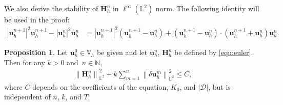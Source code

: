 \documentclass[11pt, reqno]{amsart}
\theoremstyle{definition}
\newtheorem{proposition}[theorem]{Proposition}
\theoremstyle{remark}
\numberwithin{equation}{section}
\newcommand{\bff}{\boldsymbol}
\newcommand{\bb}{\mathbb}
\newcommand{\norm}[2]{\left\|{#1}\right\|_{#2}}
\newcommand{\abs}[1]{\left|{#1}\right|}
\begin{document}
We also derive the stability of $\bff{H}_h^{n}$ in $\ell^\infty(\bb{L}^2)$ norm. The following identity will be used in the proof:
\begin{align}
	\label{equ:identity psi euler}
	\abs{\bff{u}_h^{n+1}}^2 \bff{u}_h^{n+1} - \abs{\bff{u}_h^n}^2 \bff{u}_h^n
	&=
	\abs{\bff{u}_h^{n+1}}^2 \left(\bff{u}_h^{n+1}-\bff{u}_h^n\right)
	+
	\left(\bff{u}_h^{n+1}-\bff{u}_h^n\right) \cdot \left(\bff{u}_h^{n+1}+\bff{u}_h^n\right) \bff{u}_h^n.
\end{align}

\begin{proposition}
	Let $\bff{u}_h^0 \in \bb{V}_h$ be given and let $\bff{u}_h^n$, $\bff{H}_h^{n}$ be defined by \eqref{equ:euler}. Then for any $k>0$ and~$n\in \bb{N}$,
	\begin{align}\label{equ:Hn L2 stab euler}
		\norm{\bff{H}_h^{n}}{\bb{L}^2}^2
		+
		k \sum_{m=1}^n \norm{\delta \bff{u}_h^m}{\bb{L}^2}^2
		\leq
		C,
	\end{align}
	where $C$ depends on the coefficients of the equation, $K_0$, and $|\mathscr{D}|$, but is independent of $n$, $k$, and $T$.
\end{proposition}
\end{document}
